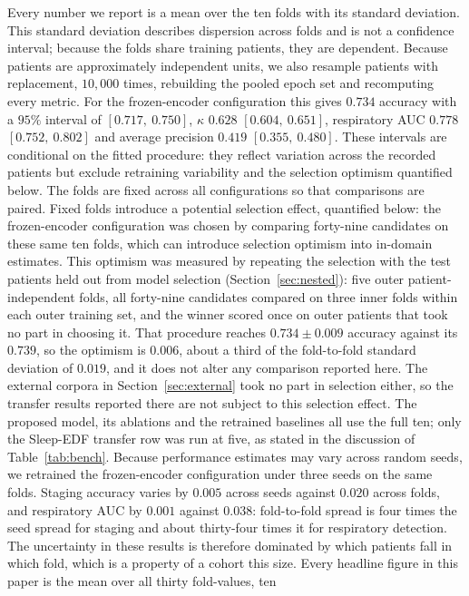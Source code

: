 \documentclass[a4paper,fleqn]{cas-sc}
\newcommand{\fzAcc}{0.739}
\begin{document}
Every number we report is a mean over the ten folds with its standard deviation. This standard deviation describes dispersion across folds and is not a confidence interval; because the folds share training patients, they are dependent. Because patients are approximately independent units, we also resample patients with replacement, $10{,}000$ times, rebuilding the pooled epoch set and recomputing every metric. For the
frozen-encoder configuration this gives $0.734$ accuracy with a $95\%$ interval of $[0.717,\ 0.750]$, $\kappa$ $0.628$
$[0.604,\ 0.651]$, respiratory AUC $0.778$ $[0.752,\ 0.802]$ and average precision $0.419$
$[0.355,\ 0.480]$. These intervals are conditional on the fitted procedure: they reflect variation across the recorded patients but exclude retraining variability and the selection optimism quantified below. The
folds are fixed across all configurations so that comparisons are paired. Fixed folds introduce a potential selection effect, quantified below: the frozen-encoder configuration was chosen by comparing forty-nine candidates on these same ten folds, which can introduce selection optimism into in-domain estimates. This optimism was measured by repeating the selection with the test patients held out from model selection (Section~\ref{sec:nested}): five outer patient-independent folds, all forty-nine candidates compared on three inner folds within each outer training set, and the winner scored once on outer patients that took no part in choosing it. That procedure reaches $0.734 \pm 0.009$ accuracy against its $\fzAcc$, so the optimism is $0.006$, about a third of the fold-to-fold standard deviation of $0.019$, and it does not alter any comparison reported here. The external corpora in Section~\ref{sec:external} took no part in selection either, so the transfer results reported there are not subject to this selection effect. The proposed
model, its ablations and the retrained baselines all use the full ten; only the Sleep-EDF
transfer row was run at five, as stated in the discussion of Table~\ref{tab:bench}. Because performance estimates may vary
across random seeds, we retrained the frozen-encoder configuration under three
seeds on the same folds. Staging accuracy varies by $0.005$ across seeds against
$0.020$ across folds, and respiratory AUC by $0.001$ against $0.038$: fold-to-fold spread
is four times the seed spread for staging and about thirty-four times it for respiratory detection.
The uncertainty in these results is therefore dominated by which patients fall in which
fold, which is a property of a cohort this size. Every headline figure in this paper is the mean over all thirty fold-values, ten
\end{document}
